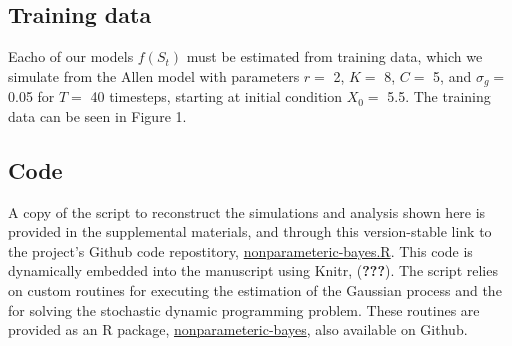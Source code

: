 \documentclass[author-year, review]{elsarticle} %
\newenvironment{Shaded}{}{}
\newcommand{\KeywordTok}[1]{\textcolor[rgb]{0.00,0.44,0.13}{\textbf{{#1}}}}
\newcommand{\DataTypeTok}[1]{\textcolor[rgb]{0.56,0.13,0.00}{{#1}}}
\newcommand{\DecValTok}[1]{\textcolor[rgb]{0.25,0.63,0.44}{{#1}}}
\newcommand{\StringTok}[1]{\textcolor[rgb]{0.25,0.44,0.63}{{#1}}}
\newcommand{\CommentTok}[1]{\textcolor[rgb]{0.38,0.63,0.69}{\textit{{#1}}}}
\newcommand{\NormalTok}[1]{{#1}}
\begin{document}
\begin{Shaded}
\end{Shaded}

\subsection{Training data}\label{training-data}

Eacho of our models $f(S_t)$ must be estimated from training data, which
we simulate from the Allen model with parameters $r = $ 2, $K =$ 8,
$C =$ 5, and $\sigma_g =$ 0.05 for $T=$ 40 timesteps, starting at
initial condition $X_0 = $ 5.5. The training data can be seen in Figure
1.

\subsection{Code}\label{code}

A copy of the script to reconstruct the simulations and analysis shown
here is provided in the supplemental materials, and through this
version-stable link to the project's Github code repostitory,
\href{}{nonparameteric-bayes.R}. This code is dynamically embedded into
the manuscript using Knitr, ({\textbf{???}}). The script relies on
custom routines for executing the estimation of the Gaussian process and
the for solving the stochastic dynamic programming problem. These
routines are provided as an R package, \href{}{nonparameteric-bayes},
also available on Github.
\end{document}
